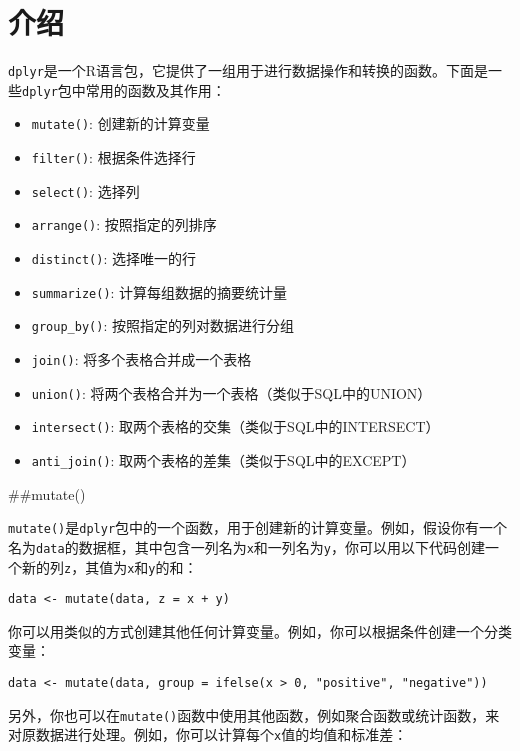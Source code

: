 \documentclass[
  letterpaper,
  DIV=11,
  numbers=noendperiod]{scrreprt}
\providecommand{\tightlist}{%
  \setlength{\itemsep}{0pt}\setlength{\parskip}{0pt}}\usepackage{longtable,booktabs,array}
\begin{document}
\hypertarget{ux4ecbux7ecd}{%
\chapter{介绍}\label{ux4ecbux7ecd}}

\texttt{dplyr}是一个R语言包，它提供了一组用于进行数据操作和转换的函数。下面是一些\texttt{dplyr}包中常用的函数及其作用：

\begin{itemize}
\tightlist
\item
  \texttt{mutate()}: 创建新的计算变量
\item
  \texttt{filter()}: 根据条件选择行
\item
  \texttt{select()}: 选择列
\item
  \texttt{arrange()}: 按照指定的列排序
\item
  \texttt{distinct()}: 选择唯一的行
\item
  \texttt{summarize()}: 计算每组数据的摘要统计量
\item
  \texttt{group\_by()}: 按照指定的列对数据进行分组
\item
  \texttt{join()}: 将多个表格合并成一个表格
\item
  \texttt{union()}: 将两个表格合并为一个表格（类似于SQL中的UNION）
\item
  \texttt{intersect()}: 取两个表格的交集（类似于SQL中的INTERSECT）
\item
  \texttt{anti\_join()}: 取两个表格的差集（类似于SQL中的EXCEPT）
\end{itemize}

\#\#mutate()

\texttt{mutate()}是\texttt{dplyr}包中的一个函数，用于创建新的计算变量。例如，假设你有一个名为\texttt{data}的数据框，其中包含一列名为\texttt{x}和一列名为\texttt{y}，你可以用以下代码创建一个新的列\texttt{z}，其值为\texttt{x}和\texttt{y}的和：

\begin{verbatim}
data <- mutate(data, z = x + y)
\end{verbatim}

你可以用类似的方式创建其他任何计算变量。例如，你可以根据条件创建一个分类变量：

\begin{verbatim}
data <- mutate(data, group = ifelse(x > 0, "positive", "negative"))
\end{verbatim}

另外，你也可以在\texttt{mutate()}函数中使用其他函数，例如聚合函数或统计函数，来对原数据进行处理。例如，你可以计算每个\texttt{x}值的均值和标准差：
\end{document}
